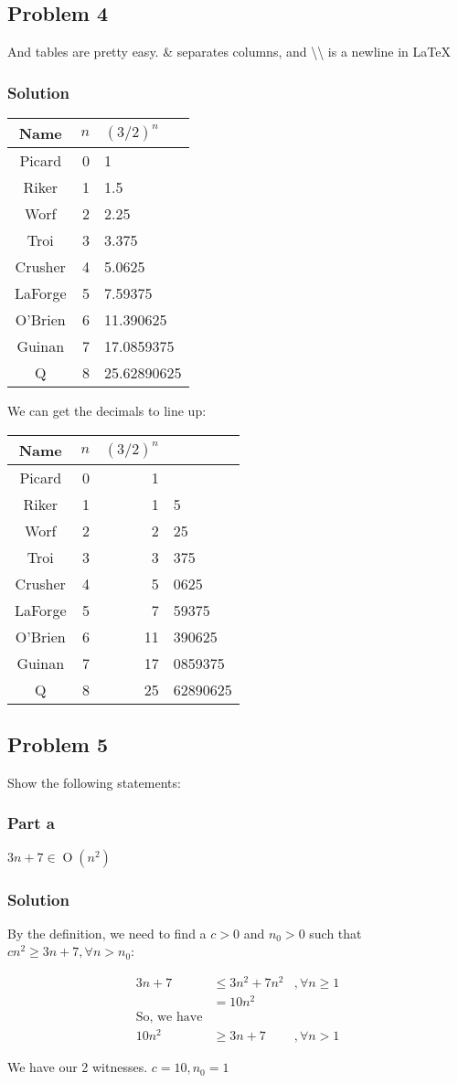 \documentclass[10pt,letterpaper,oneside]{article}
\newcommand{\Problem}[1]{\subsection*{Problem #1}}
\newcommand{\Part}[1]{\subsubsection*{Part #1}}
\newenvironment{Solution}
{
	\color{blue!80!black}
	\subsubsection*{Solution}
}
{}
\DeclareMathOperator{\Omicron}{O}
\newcommand{\BigOh}[1]{\Omicron(#1)}
\begin{document}
\Problem{4}
	And tables are pretty easy.  \& separates columns, and
	\textbackslash{}\textbackslash{} is a newline in \LaTeX

	\begin{Solution}
		\begin{center}
		\begin{tabular}{ c | r | l }
			Name & $n$ & $(3/2)^n$ \\
			\hline
			Picard & 0  & 1 \\
			Riker & 1  & 1.5 \\
			Worf & 2	& 2.25 \\
			Troi & 3	& 3.375 \\
			Crusher & 4	& 5.0625 \\
			LaForge & 5	& 7.59375 \\
			O'Brien & 6	& 11.390625 \\
			Guinan & 7	& 17.0859375 \\
			Q & 8	& 25.62890625 
		\end{tabular}
		\end{center}

		We can get the decimals to line up:

		\begin{center}
		\begin{tabular}{ c | r | r @{.} l }
			Name & $n$ & $(3/2)^n$ \\
			\hline
			Picard & 0  & 1 & \\
			Riker & 1  & 1 & 5 \\
			Worf & 2	& 2 & 25 \\
			Troi & 3	& 3 & 375 \\
			Crusher & 4	& 5 & 0625 \\
			LaForge & 5	& 7 & 59375 \\
			O'Brien & 6	& 11 & 390625 \\
			Guinan & 7	& 17 & 0859375 \\
			Q & 8	& 25 & 62890625 
		\end{tabular}
		\end{center}
	\end{Solution}

\Problem{5}
	Show the following statements:

	\Part{a}
		$ 3n+7 \in \BigOh{n^2} $
	
	\begin{Solution}
		By the definition, we need to find a $c>0$ and $n_0>0$ such that $cn^2
		\geq 3n+7 , \forall n>n_0$:

		\[
		\begin{array}{lll}
			3n+7 & \leq 3n^2 + 7n^2 & ,\forall n\geq1 \\
			     & =    10n^2 \\
			\text{So, we have} \\
			10n^2 & \geq 3n+7 & ,\forall n>1
		\end{array}
		\]

		We have our 2 witnesses.  $c=10 , n_0=1$
	\end{Solution}
 
\end{document}
